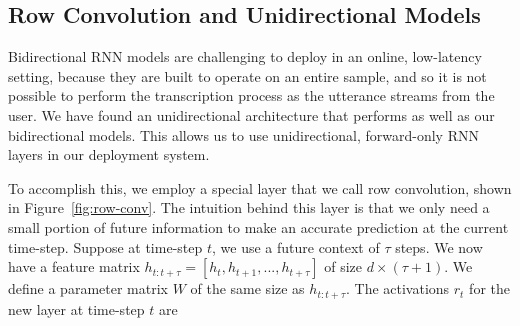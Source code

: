 
\subsection{Row Convolution and Unidirectional Models}

Bidirectional RNN models are challenging to deploy in an online, low-latency
setting, because they are built to operate on an entire sample, and so it is
not possible to perform the transcription process as the utterance streams from
the user. We have found an unidirectional architecture that performs as well as
our bidirectional models. This allows us to use unidirectional, forward-only
RNN layers in our deployment system. 


To accomplish this, we employ a special layer that we call row convolution,
shown in Figure~\ref{fig:row-conv}. The intuition behind this layer is that we
only need a small portion of future information to make an accurate prediction
at the current time-step. Suppose at time-step $t$, we use a future context of
$\tau$ steps. We now have a feature matrix $h_{t:t+\tau} = [h_t, h_{t+1}, ...,
h_{t+\tau}]$ of size $d\times(\tau+1)$. We define a parameter matrix $W$ of the
same size as $h_{t:t+\tau}$. The activations $r_t$ for the new layer at
time-step $t$ are 

